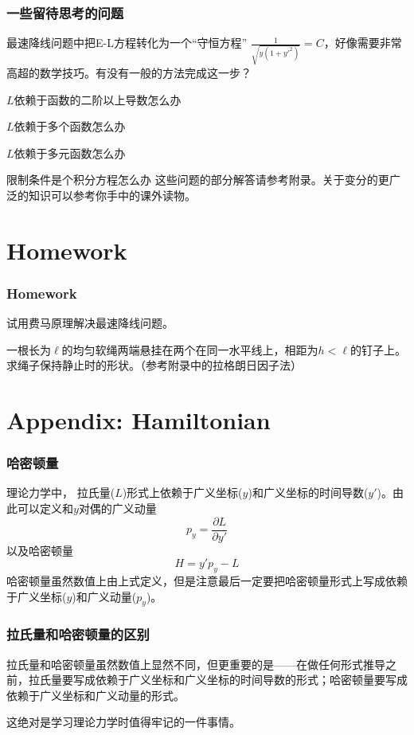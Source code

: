 \documentclass[CJK]{beamer}
\begin{document}

\begin{frame}
  \frametitle{一些留待思考的问题}
  \bitem
\item{最速降线问题中把E-L方程转化为一个“守恒方程” $\frac{1}{\sqrt{y(1+y'^2)}} = C$，好像需要非常高超的数学技巧。有没有一般的方法完成这一步？}
\item{$L$依赖于函数的二阶以上导数怎么办}  
\item{$L$依赖于多个函数怎么办}
\item{$L$依赖于多元函数怎么办}
\item{限制条件是个积分方程怎么办}  
  \eitem
  这些问题的部分解答请参考附录。关于变分的更广泛的知识可以参考你手中的课外读物。
\end{frame}

\section{Homework}

\begin{frame}
  \frametitle{Homework}
  \bitem
  \item{试用费马原理解决最速降线问题。}
  \item{一根长为$\ell$的均匀软绳两端悬挂在两个在同一水平线上，相距为$h<\ell$的钉子上。求绳子保持静止时的形状。（参考附录中的拉格朗日因子法）}  
  \eitem
\end{frame}



\section{Appendix: Hamiltonian}

\begin{frame}
  \frametitle{哈密顿量}
  理论力学中， {\blue 拉氏量($L$)形式上依赖于广义坐标($y$)和广义坐标的时间导数($y'$)}。由此可以定义和$y$对偶的广义动量
  $$ p_y = \frac{\partial L}{\partial y'}$$
  以及哈密顿量
  $$H = y' p_y - L $$
  哈密顿量虽然数值上由上式定义，但是注意{\blue 最后一定要把哈密顿量形式上写成依赖于广义坐标($y$)和广义动量($p_y$)}。
\end{frame}

\begin{frame}
  \frametitle{拉氏量和哈密顿量的区别}
  拉氏量和哈密顿量虽然数值上显然不同，但更重要的是——在做任何形式推导之前，{\blue 拉氏量要写成依赖于广义坐标和广义坐标的时间导数的形式；哈密顿量要写成依赖于广义坐标和广义动量的形式}。

  \skipline
  
  这绝对是学习理论力学时值得牢记的一件事情。
\end{frame}
\end{document}
